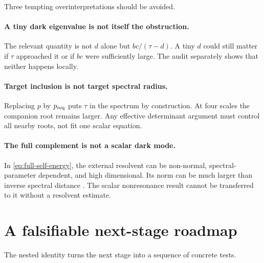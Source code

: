 \documentclass[11pt]{article}
\theoremstyle{definition}
\theoremstyle{remark}
\begin{document}
Three tempting overinterpretations should be avoided.

\paragraph{A tiny dark eigenvalue is not itself the obstruction.}
The relevant quantity is not $d$ alone but $bc/(\tau-d)$.  A tiny $d$ could
still matter if $\tau$ approached it or if $bc$ were sufficiently large.
The audit separately shows that neither happens locally.

\paragraph{Target inclusion is not target spectral radius.}
Replacing $p$ by $p_{\rm req}$ puts $\tau$ in the spectrum by construction.
At four scales the companion root remains larger.  Any effective determinant
argument must control all nearby roots, not fit one scalar equation.

\paragraph{The full complement is not a scalar dark mode.}
In \eqref{eq:full-self-energy}, the external resolvent can be non-normal,
spectral-parameter dependent, and high dimensional.  Its norm can be much
larger than inverse spectral distance \citep{TrefethenEmbree2005}.  The
scalar nonresonance result cannot be transferred to it without a resolvent
estimate.

\section{A falsifiable next-stage roadmap}
\label{sec:roadmap}

The nested identity turns the next stage into a sequence of concrete tests.
\end{document}
